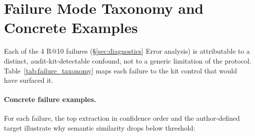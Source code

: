 \documentclass[11pt]{article}
\begin{document}
\section{Failure Mode Taxonomy and Concrete Examples}\label{app:failures}

Each of the 4 R@10 failures (\S\ref{sec:diagnostics} Error analysis) is attributable to a distinct, audit-kit-detectable confound, not to a generic limitation of the protocol. Table~\ref{tab:failure_taxonomy} maps each failure to the kit control that would have surfaced it.

\begin{table}[h]
\centering
\caption{Failure mode taxonomy: each of the 4 R@10 failures has a distinct, kit-detectable root cause.}
\label{tab:failure_taxonomy}
\footnotesize
\setlength{\tabcolsep}{4pt}
\end{table}

\paragraph{Concrete failure examples.} For each failure, the top extraction in confidence order and the author-defined target illustrate why semantic similarity drops below threshold:
\end{document}
